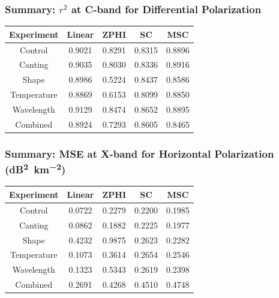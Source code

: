 \documentclass[red]{beamer}
\begin{document}
\begin{frame}
    \frametitle{Summary: $r^2$ at C-band for Differential Polarization}
    \begin{center}
        \begin{tabular}{| c | c | c | c | c |}
            \hline
            Experiment & Linear & ZPHI & SC & MSC \\
            \hline
            \hline
            Control & 0.9021 & 0.8291 & 0.8315 & 0.8896 \\
            Canting & 0.9035 & 0.8030 & 0.8336 & 0.8916 \\
            Shape & 0.8986 & 0.5224 & 0.8437 & 0.8586 \\
            Temperature & 0.8869 & 0.6153 & 0.8099 & 0.8850 \\
            Wavelength & 0.9129 & 0.8474 & 0.8652 & 0.8895 \\
            Combined & 0.8924 & 0.7293 & 0.8605 & 0.8465 \\
            \hline
        \end{tabular}
    \end{center}
\end{frame}

\begin{frame}
    \frametitle{Summary: MSE at X-band for Horizontal Polarization (\si{dB\squared\per \kilo\meter\squared})}
    \begin{center}
        \begin{tabular}{| c | c | c | c | c |}
            \hline
            Experiment & Linear & ZPHI & SC & MSC \\
            \hline
            \hline
            Control & 0.0722 & 0.2279 & 0.2200 & 0.1985 \\
            Canting & 0.0862 & 0.1882 & 0.2225 & 0.1977 \\
            Shape & 0.4232 & 0.9875 & 0.2623 & 0.2282 \\
            Temperature & 0.1073 & 0.3614 & 0.2654 & 0.2546 \\
            Wavelength & 0.1323 & 0.5343 & 0.2619 & 0.2398 \\
            Combined & 0.2691 & 0.4268 & 0.4510 & 0.4748 \\
            \hline
        \end{tabular}
    \end{center}
\end{frame}
\end{document}
